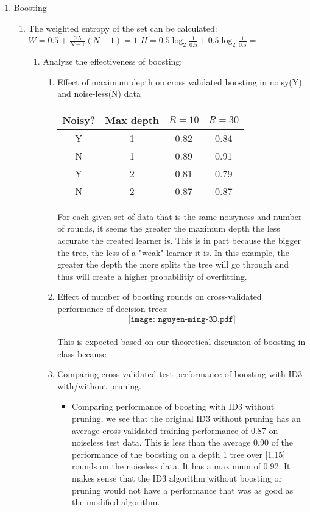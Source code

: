 \documentclass[11pt]{article}
\begin{document}
\begin{enumerate}
\item Boosting
\begin{enumerate}
	\item The weighted entropy of the set can be calculated:\\
	$W=0.5 + \frac{0.5}{N-1}(N-1) = 1$
	$H = 0.5\log_2 \frac{1}{0.5} + 0.5\log_2 \frac{1}{0.5} =$ 
	\begin{enumerate} 
	\item Analyze the effectiveness of boosting:
		\begin{enumerate}
			\item Effect of maximum depth on cross validated boosting in noisy(Y) and noise-less(N) data
				\begin{center}
				\begin{tabular}{|c|c|c|c|}
				\hline
				Noisy? & Max depth & $R = 10$ & $R = 30$\\ \hline
				Y & 1 & 0.82 & 0.84\\ \hline
				N & 1 & 0.89 & 0.91\\ \hline
				Y & 2 & 0.81 & 0.79 \\ \hline
				N & 2 & 0.87 & 0.87\\
				\hline
				\end{tabular}
				\end{center}
			For each given set of data that is the same noisyness and number of rounds, it seems the greater the maximum depth the less accurate the created learner is. This is in part because the bigger the tree, the less of a "weak" learner it is. In this example, the greater the depth the more splits the tree will go through and thus will create a higher probabilitiy of overfitting.
			\item Effect of number of boosting rounds on cross-validated performance of decision trees:\\
			 $$\texttt{[image: nguyen-ming-3D.pdf]}$$\\
			This is expected based on our theoretical discussion of boosting in class because
			\item Comparing cross-validated test performance of boosting with ID3 with/without pruning. 
			\begin{itemize}
			\item Comparing performance of boosting with ID3 without pruning, we see that the original ID3 without pruning has an average cross-validated training performance of 0.87 on noiseless test data. This is less than the average 0.90 of the performance of the boosting on a depth 1 tree over [1,15] rounds on the noiseless data. It has a maximum of 0.92. It makes sense that the ID3 algorithm without boosting or pruning would not have a performance that was as good as the modified algorithm.

\end{itemize}
\end{enumerate}
\end{enumerate}
\end{enumerate}
\end{enumerate}
\end{document}
